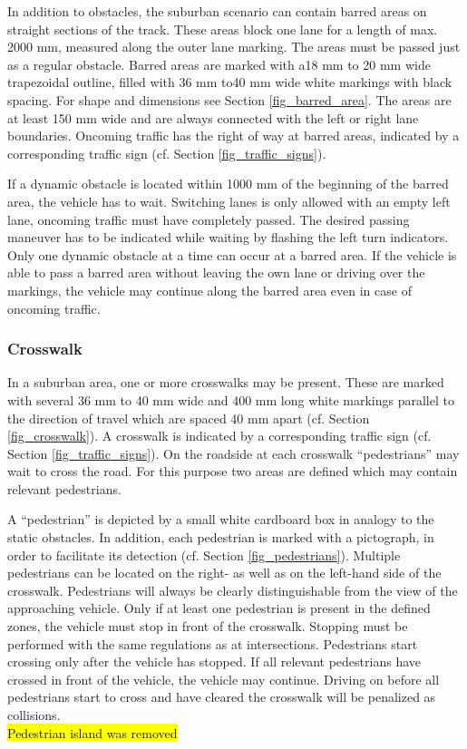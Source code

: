 \documentclass[a4paper]{report}
\begin{document}
{{In addition to obstacles, the suburban scenario can contain barred areas on straight sections of the track. These areas block one lane for a length of max. 2000 mm, measured along the outer lane marking. The areas must be passed just as a regular obstacle. Barred areas are marked with a18 mm to 20 mm wide trapezoidal outline, filled with 36 mm to40 mm wide white markings with black spacing. For shape and dimensions see Section \ref{fig_barred_area}. The areas are at least 150 mm wide and are always connected with the left or right lane boundaries. Oncoming traffic has the right of way at barred areas, indicated by a corresponding traffic sign (cf. Section \ref{fig_traffic_signs}). 

If a dynamic obstacle is located within 1000 mm of the beginning of the barred area, the vehicle has to wait. Switching lanes is only allowed with an empty left lane, oncoming traffic must have completely passed. The desired passing maneuver has to be indicated while waiting by flashing the left turn indicators. Only one dynamic obstacle at a time can occur at a barred area. If the vehicle is able to pass a barred area without leaving the own lane or driving over the markings, the vehicle may continue along the barred area even in case of oncoming traffic. 

\subsubsection{Crosswalk}

In a suburban area, one or more crosswalks may be present. These are marked with several 36 mm to 40 mm wide and 400 mm long white markings parallel to the direction of travel which are spaced 40 mm apart (cf. Section \ref{fig_crosswalk}). A crosswalk is indicated by a corresponding traffic sign (cf. Section \ref{fig_traffic_signs}). On the roadside at each crosswalk “pedestrians” may wait to cross the road. For this purpose two areas are defined which may contain relevant pedestrians. 

A “pedestrian” is depicted by a small white cardboard box in analogy to the static obstacles. In addition, each pedestrian is marked with a pictograph, in order to facilitate its detection (cf. Section \ref{fig_pedestrians}). Multiple pedestrians can be located on the right- as well as on the left-hand side of the crosswalk. Pedestrians will always be clearly distinguishable from the view of the approaching vehicle. Only if at least one pedestrian is present in the defined zones, the vehicle must stop in front of the crosswalk. Stopping must be performed with the same regulations as at intersections. Pedestrians start crossing only after the vehicle has stopped. If all relevant pedestrians have crossed in front of the vehicle, the vehicle may continue. Driving on before all pedestrians start to cross and have cleared the crosswalk will be penalized as collisions. 
\bigskip\\
\colorbox{yellow}{Pedestrian island was removed} 

}}
\end{document}
